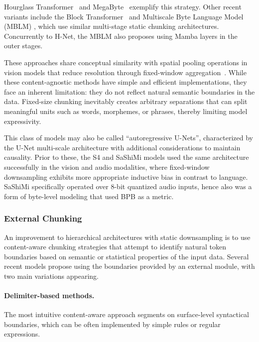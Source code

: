 Hourglass Transformer~\citep{HourglassTransformer} and MegaByte~\citep{MegaByte} exemplify this strategy.
Other recent variants include the Block Transformer~\citep{ho2024block} and Multiscale Byte Language Model (MBLM) \citep{egli2025multiscale}, which use similar multi-stage static chunking architectures.
Concurrently to H-Net, the MBLM also proposes using Mamba layers in the outer stages.

These approaches share conceptual similarity with spatial pooling operations in vision models that reduce resolution through fixed-window aggregation~\citep{AlexNet, ResNet}.
While these content-agnostic methods have simple and efficient implementations, they face an inherent limitation: they do not reflect natural semantic boundaries in the data.
Fixed-size chunking inevitably creates arbitrary separations that can split meaningful units such as words, morphemes, or phrases, thereby limiting model expressivity.

This class of models may also be called ``autoregressive U-Nets'', characterized by the U-Net multi-scale architecture \citep{U-Net} with additional considerations to maintain causality.
Prior to these, the S4 and SaShiMi models \citep{S4,SaShiMi} used the same architecture successfully in the vision and audio modalities, where fixed-window downsampling exhibits more appropriate inductive bias in contrast to language.
SaShiMi specifically operated over 8-bit quantized audio inputs, hence also was a form of byte-level modeling that used BPB as a metric.

\subsubsection{External Chunking}
\label{sec:background:ar:external} 

An improvement to hierarchical architectures with static downsampling is to use content-aware chunking strategies that attempt to identify natural token boundaries based on semantic or statistical properties of the input data.
Several recent models propose using the boundaries provided by an external module, with two main variations appearing.

\paragraph{Delimiter-based methods.}
The most intuitive content-aware approach segments on surface-level syntactical boundaries, which can be often implemented by simple rules or regular expressions.

